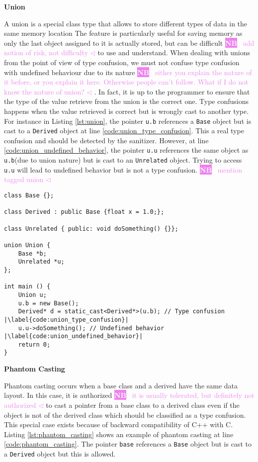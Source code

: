 \documentclass[a4paper,11pt,oneside]{report}
\newcommand{\todobox}[3]{%
       \colorbox{#1}{\textcolor{white}{\sffamily\bfseries\scriptsize #2}}%
       ~\textcolor{#1}{#3} %
       \textcolor{#1}{$\triangleleft$}%
}
\newcommand{\nb}[1]{\todobox{violet}{NB}{#1}}
\begin{document}
\textbf{Union}

\noindent{}A union is a special class type that allows to store different types
of data in the same memory location The feature is particularly useful for
saving memory as only the last object assigned to it is actually stored, but can
be difficult \nb{add notion of risk, not difficulty}to use and understand. When dealing with unions from the point of
view of type confusion, we must not confuse type confusion with undefined
behaviour due to its nature\nb{either you explain the nature of it before, or you explain it here. Otherwise people can't follow. What if I do not know the nature of union?}. In fact, it is up to the programmer to ensure that
the type of the value retrieve from the union is the correct one. Type
confusions happens when the value retrieved is correct but is wrongly cast to
another type. For instance in Listing \autoref{lst:union}, the pointer
\texttt{u.b} references a \texttt{Base} object but is cast to a \texttt{Derived}
object at line \ref{code:union_type_confusion}.  This a real type confusion and
should be detected by the sanitizer. However, at line
\ref{code:union_undefined_behavior}, the pointer \texttt{u.u} references the
same object as \texttt{u.b}(due to union nature) but is cast to an
\texttt{Unrelated} object.  Trying to access \texttt{u.u} will lead to undefined
behavior but is not a type confusion.\nb{mention tagged union}


\begin{listing}
       \begin{verbatim}
class Base {};

class Derived : public Base {float x = 1.0;};

class Unrelated { public: void doSomething() {}};

union Union {
    Base *b;
    Unrelated *u;
};

int main () {
    Union u;
    u.b = new Base(); 
    Derived* d = static_cast<Derived*>(u.b); // Type confusion |\label{code:union_type_confusion}|
    u.u->doSomething(); // Undefined behavior |\label{code:union_undefined_behavior}|
    return 0;
}
       \end{verbatim}
       \caption{Union example}
       \label{lst:union}
\end{listing}

\textbf{Phantom Casting}

\noindent{}Phantom casting occurs when a base class and a derived have the same
data layout.  In this case, it is authorized \nb{it is usually tolerated, but definitely not authorized }to cast a pointer from a base class
to a derived class even if the object is not of the derived class which should
be classified as a type confusion.  This special case exists because of backward
compatibility of C++ with C. Listing \autoref{lst:phantom_casting} shows an
example of phantom casting at line \ref{code:phantom_casting}.  The pointer
\texttt{base} references a \texttt{Base} object but is cast to a
\texttt{Derived} object but this is allowed.
\end{document}
